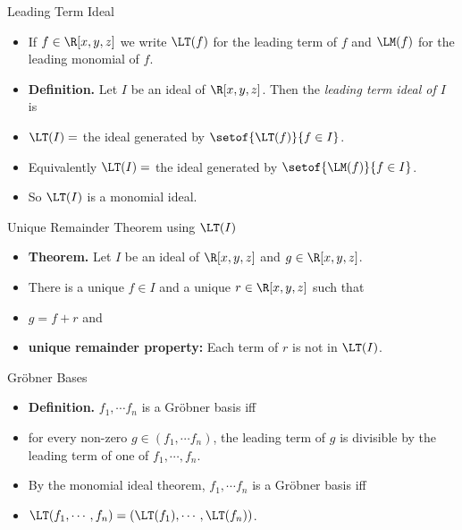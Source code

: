 \documentclass{beamer}
\begin{document}
\begin{frame}{Leading Term Ideal}

\begin{itemize}
  \item If $f\in\R[x,y,z]$ we write $\LT(f)$ for the leading term of $f$ and $\LM(f)$ for the leading monomial of $f$.
  \item \textbf{Definition.}  Let $I$ be an ideal of $\R[x,y,z]$. Then the \emph{leading term ideal of $I$} is
  \item $\LT(I) = $ the ideal generated by $\setof{\LT(f)}{f\in I}$.
  \item Equivalently $\LT(I) = $ the ideal generated by $\setof{\LM(f)}{f\in I}$.
  \item So $\LT(I)$ is a monomial ideal.
\end{itemize}

\end{frame}


\begin{frame}{Unique Remainder Theorem using $\LT(I)$}

\begin{itemize}
  \item \textbf{Theorem.} Let $I$ be an ideal of $\R[x,y,z]$ and $g\in\R[x,y,z]$.
  \item There is a unique $f\in I$ and a unique $r\in\R[x,y,z]$ such that
  \item $g = f + r$  and
  \item \textbf{unique remainder property:} Each term of $r$ is not in $\LT(I)$.
\end{itemize}

\end{frame}


\begin{frame}{ Gr\"{o}bner Bases}

\begin{itemize}
  \item \textbf{Definition.} $f_1,\cdots f_n $ is a Gr\"{o}bner basis iff
  \item for every non-zero $g\in (f_1,\cdots f_n)$, the leading term of $g$ is divisible
  by the leading term of one of $f_1,\cdots,f_n$.
  \item By the monomial ideal theorem, $f_1,\cdots f_n$ is a Gr\"{o}bner basis iff
  \item $\LT(f_1,\cdots,f_n) = (\LT(f_1),\cdots,\LT(f_n))$.
\end{itemize}

\end{frame}
\end{document}
